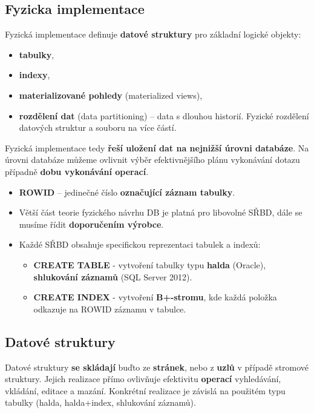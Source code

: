 \subsection{Fyzicka implementace}
Fyzická implementace definuje \textbf{datové struktury} pro základní logické objekty:

\begin{itemize}
\item \textbf{tabulky},
\item \textbf{indexy},
\item \textbf{materializované pohledy} (materialized views),
\item \textbf{rozdělení dat} (data partitioning) --  data s dlouhou historií. Fyzické rozdělení datových struktur a souboru na více částí.
\end{itemize}

Fyzická implementace tedy \textbf{řeší uložení dat na nejnižší úrovni databáze}.
 Na úrovni databáze můžeme ovlivnit výběr efektivnějšího plánu vykonávání dotazu případně \textbf{dobu vykonávání operací}.

\begin{itemize}
\item \textbf{ROWID} -- jedinečné číslo \textbf{označující záznam tabulky}.
\item Větší část teorie fyzického návrhu DB je platná pro libovolné SŘBD, dále se musíme řídit \textbf{doporučením výrobce}.
\item Každé SŘBD obsahuje specifickou reprezentaci tabulek a indexů:
\begin{itemize}
\item \textbf{CREATE TABLE} - vytvoření tabulky typu \textbf{halda} (Oracle), \textbf{shlukování záznamů} (SQL Server 2012).
\item \textbf{CREATE INDEX} - vytvoření\textbf{ B+-stromu}, kde každá položka odkazuje na ROWID záznamu v tabulce.
\end{itemize}
\end{itemize}

\subsection{Datové struktury}
Datové struktury \textbf{se skládají} buďto ze \textbf{stránek}, nebo z \textbf{uzlů} v případě stromové struktury. Jejich realizace přímo ovlivňuje efektivitu \textbf{operací} vyhledávání, vkládání, editace a mazání. Konkrétní realizace je závislá na použitém typu tabulky (halda, halda+index, shlukování záznamů).

